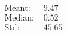 \documentclass[preview]{standalone}
\begin{document}
\begin{align*}
\text{Meant: } &9.47\\\text{Median: } &0.52\\\text{Std: } &45.65
\end{align*}
\end{document}
